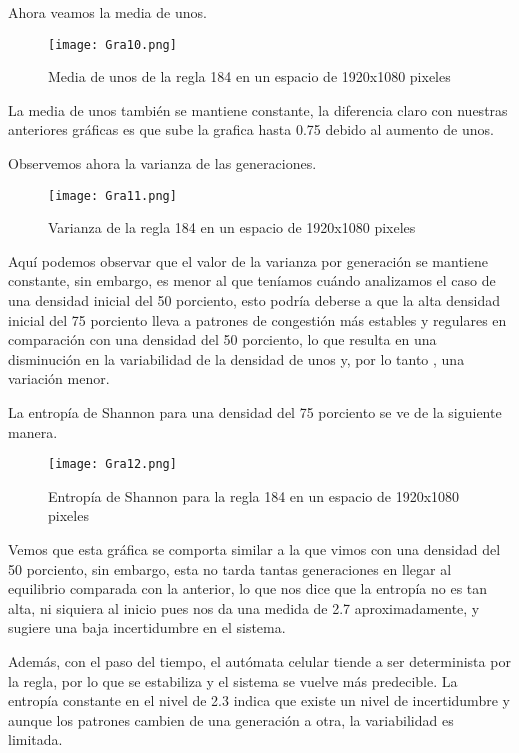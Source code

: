 \documentclass{article}
\begin{document}
\begin{itemize}
		Ahora veamos la media de unos. 
		
		\begin{figure}[h]
		 	\centering       
		 	\texttt{[image: Gra10.png]}
		 	\caption{Media de unos de la regla 184 en un espacio de 1920x1080 pixeles}
		 	\label{fig:mi_imagen1}
		\end{figure}
		
		La media de unos también se mantiene constante, la diferencia claro con nuestras anteriores gráficas es que sube la grafica hasta 0.75 debido al aumento de unos. 
		
		Observemos ahora la varianza de las generaciones.
		
		\begin{figure}[h]
			\centering       
			\texttt{[image: Gra11.png]}
			\caption{Varianza de la regla 184 en un espacio de 1920x1080 pixeles}
			\label{fig:mi_imagen1}
		\end{figure}
		
		Aquí podemos observar que el valor de la varianza por generación se mantiene constante, sin embargo, es menor al que teníamos cuándo analizamos el caso de una densidad inicial del 50 porciento, esto podría deberse a que la alta densidad inicial del 75 porciento lleva a patrones de congestión más estables y regulares en comparación con una densidad del 50 porciento, lo que resulta en una disminución en la variabilidad de la densidad de unos y, por lo tanto , una variación menor.
		
		La entropía de Shannon para una densidad del 75 porciento se ve de la siguiente manera. 
	
		\begin{figure}[h]
			\centering       
			\texttt{[image: Gra12.png]}
			\caption{Entropía de Shannon para la regla 184 en un espacio de 1920x1080 pixeles}
			\label{fig:mi_imagen1}
		\end{figure}
		
		\vspace{300pt}
		
		Vemos que esta gráfica se comporta similar a la que vimos con una densidad del 50 porciento, sin embargo, esta no tarda tantas generaciones en llegar al equilibrio comparada con la anterior, lo que nos dice que la entropía no es tan alta, ni siquiera al inicio pues nos da una medida de 2.7 aproximadamente, y sugiere una baja incertidumbre en el sistema.
		
		Además, con el paso del tiempo, el autómata celular tiende a ser determinista por la regla, por lo que se estabiliza y el sistema se vuelve más predecible. La entropía constante en el nivel de 2.3 indica que existe un nivel de incertidumbre y aunque los patrones cambien de una generación a otra, la variabilidad es limitada. 
		

\end{itemize}
\end{document}
